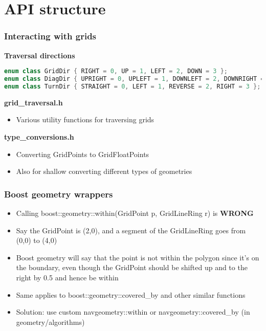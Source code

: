 \documentclass{beamer}
\begin{document}
\section{API structure}

\begin{frame}[fragile]
    \frametitle{Interacting with grids}
    \textbf{Traversal directions}
    \begin{lstlisting}[language=C++, basicstyle=\tiny]
enum class GridDir { RIGHT = 0, UP = 1, LEFT = 2, DOWN = 3 };
enum class DiagDir { UPRIGHT = 0, UPLEFT = 1, DOWNLEFT = 2, DOWNRIGHT = 3 };
enum class TurnDir { STRAIGHT = 0, LEFT = 1, REVERSE = 2, RIGHT = 3 };
    \end{lstlisting}
    \textbf{grid\_traversal.h}
    \begin{itemize}
        \item Various utility functions for traversing grids
    \end{itemize}
    \textbf{type\_conversions.h}
    \begin{itemize}
        \item Converting GridPoints to GridFloatPoints
        \item Also for shallow converting different types of geometries
    \end{itemize}
\end{frame}

\begin{frame}
    \frametitle{Boost geometry wrappers}
    \begin{itemize}
        \item Calling boost::geometry::within(GridPoint p, GridLineRing r) is \textbf{WRONG}
        \item Say the GridPoint is (2,0), and a segment of the GridLineRing goes from (0,0) to (4,0)
        \item Boost geometry will say that the point is not within the polygon since it's on the boundary, even though the GridPoint should be shifted up and to the right by 0.5 and hence be within
        \item Same applies to boost::geometry::covered\_by and other similar functions
        \item Solution: use custom navgeometry::within or navgeometry::covered\_by (in geometry/algorithms)
    \end{itemize}
\end{frame}
\end{document}
